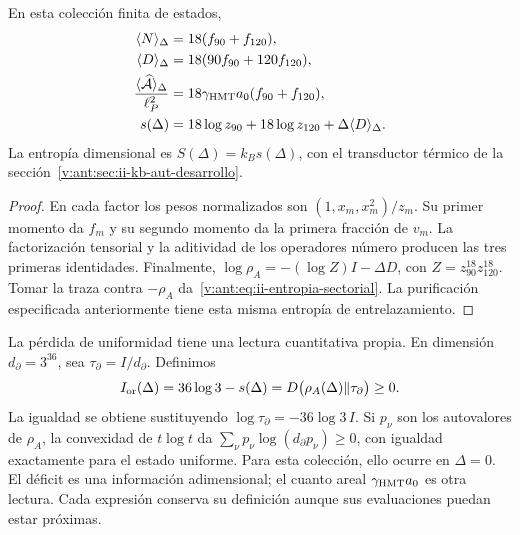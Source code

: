 \begin{proposition}
En esta colección finita de estados,
\begin{align}
 \langle N\rangle_\Delta&=18(f_{90}+f_{120}),\\
 \langle D\rangle_\Delta&=18(90f_{90}+120f_{120}),\\
 \frac{\langle\widehat{\mathcal A}\rangle_\Delta}{\ell_P^2}
 &=18\gamma_{\mathrm{HMT}}a_0(f_{90}+f_{120}),
 \label{v:ant:eq:ii-area-media}\\
 s(\Delta)&=18\log z_{90}+18\log z_{120}
                  +\Delta\langle D\rangle_\Delta.
 \label{v:ant:eq:ii-entropia-sectorial}
\end{align}
La entropía dimensional es $S(\Delta)=k_Bs(\Delta)$, con el
transductor térmico de la sección~\ref{v:ant:sec:ii-kb-aut-desarrollo}.
\end{proposition}
\begin{proof}
En cada factor los pesos normalizados son
$(1,x_m,x_m^2)/z_m$. Su primer momento da $f_m$ y su segundo
momento da la primera fracción de $v_m$. La factorización tensorial
y la aditividad de los operadores número producen las tres primeras
identidades. Finalmente,
$\log\rho_A=-(\log Z)I-\Delta D$, con
$Z=z_{90}^{18}z_{120}^{18}$. Tomar la traza contra $-\rho_A$
da~\eqref{v:ant:eq:ii-entropia-sectorial}. La purificación especificada
anteriormente tiene esta misma entropía de entrelazamiento.
\end{proof}

La pérdida de uniformidad tiene una lectura cuantitativa propia.
En dimensión \(d_\partial=3^{36}\), sea
\(\tau_\partial=I/d_\partial\). Definimos
\begin{equation}
 I_{\rm or}(\Delta)=36\log3-s(\Delta)
 =D\bigl(\rho_A(\Delta)\Vert\tau_\partial\bigr)\ge0.
 \label{v:ant:eq:ii-area-deficit-informacional}
\end{equation}
La igualdad se obtiene sustituyendo
\(\log\tau_\partial=-36\log3\,I\). Si \(p_\nu\) son los
autovalores de \(\rho_A\), la convexidad de \(t\log t\) da
\(\sum_\nu p_\nu\log(d_\partial p_\nu)\ge0\), con igualdad
exactamente para el estado uniforme. Para esta colección, ello ocurre en
\(\Delta=0\). El déficit es una información adimensional; el cuanto
areal \(\gamma_{\mathrm{HMT}}a_0\) es otra lectura. Cada expresión conserva
su definición aunque sus evaluaciones puedan estar próximas.

